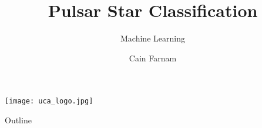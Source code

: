 
\usepackage[utf8]{inputenc}


\usepackage{amsmath}
\usepackage{amsfonts}
\usepackage{amssymb}
\usepackage{graphicx}
\usepackage{array}
\usepackage{tcolorbox}
\usepackage{colortbl}
\usepackage{float}
\usepackage{multicol}
\usepackage{mathtools}
\usepackage{subcaption}


\author{Cain Farnam}
\title[Machine Learning]{Pulsar Star Classification}
\subtitle{Machine Learning}
\date{} 



\begin{frame}
\maketitle
\begin{center}
    \texttt{[image: uca\_logo.jpg]}
\end{center}
\end{frame}

\begin{frame}{Outline}
	\tableofcontents
\end{frame}